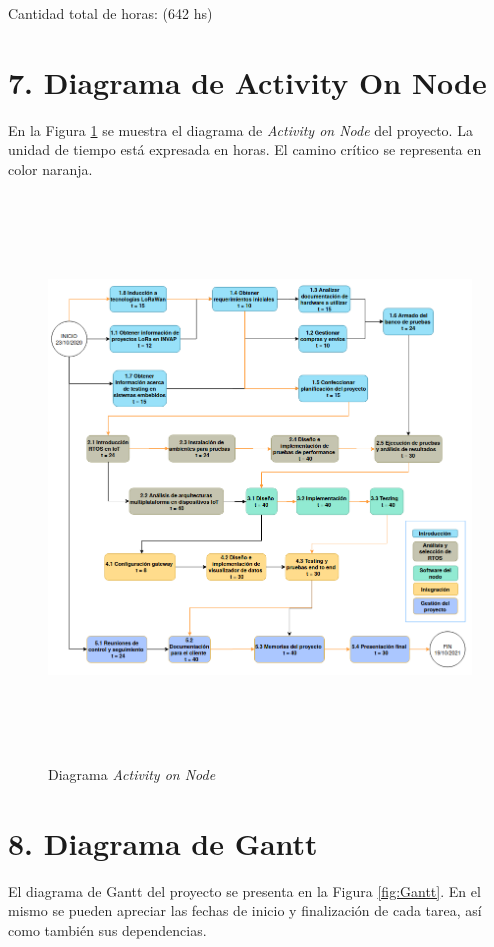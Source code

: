 \documentclass[11pt]{charter}
\begin{document}
Cantidad total de horas: (642 hs)


\section{7. Diagrama de Activity On Node}
\label{sec:AoN}

En la Figura \ref{fig:AoN} se muestra el diagrama de \textit{Activity on Node} del proyecto. La unidad de tiempo está expresada en horas.
El camino crítico se representa en color naranja.
\begin{figure}[htpb]
\centering 
\includegraphics[width=16cm, height=15cm]{./Figuras/aon.png}
\caption{Diagrama \textit{Activity on Node}}
\label{fig:AoN}
\end{figure}



\section{8. Diagrama de Gantt}
\label{sec:gantt}

El diagrama de Gantt del proyecto se presenta en la Figura \ref{fig:Gantt}. En el mismo se pueden apreciar las fechas de inicio y finalización de cada tarea, así como también sus dependencias.
\end{document}
